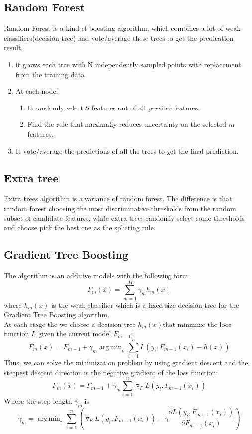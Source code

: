 \documentclass[conference]{IEEEtran}
\DeclareMathOperator*{\argmin}{arg\,min}
\begin{document}
\subsection{Random Forest}
Random Forest is a kind of boosting algorithm, which combines a lot of weak classifiers(decision tree) and vote/average these trees to get the predication result.
\begin{enumerate}
\item it grows each tree with N independently sampled points with replacement from the training data.
\item At each node:
\begin{enumerate}
\item It randomly select $S$ features out of all possible features.
\item Find the rule that maximally reduces uncertainty on the selected $m$ features.
\end{enumerate}
\item It vote/average the predictions of all the trees to get the final prediction.
\end{enumerate}

\subsection{Extra tree}
Extra trees algorithm is a variance of random forest. The difference is that random forest choosing the most discriminative thresholds from the random subset of candidate features, while extra trees randomly select some thresholds and choose pick the best one as the splitting rule.

\subsection{Gradient Tree Boosting}
The algorithm is an additive models with the following form
\begin{equation}
F_m(x)=\sum_{m=1}^{M}\gamma_m h_m(x)
\end{equation}
where $h_m(x)$ is the weak classifier which is a fixed-size decision tree for the Gradient Tree Boosting algorithm. \\
At each stage the we choose a decision tree $h_m(x)$that minimize the loos function $L$ given the current model $F_{m-1}$:  
\begin{equation}
F_m(x)=F_{m-1}+\gamma_m \argmin_h\sum_{i=1}^n L(y_i,F_{m-1}(x_i)-h(x))
\end{equation}
\indent Thus, we can solve the minimization problem by using gradient descent and the steepest descent direction is the negative gradient of the loss function:
\begin{equation}
F_m(x)=F_{m-1}+\gamma_m \sum_{i=1}^n \triangledown_F L(y_i,F_{m-1}(x_i))
\end{equation}
Where the step length $\gamma_m$ is 
\begin{equation}
\gamma_m=\argmin_{\gamma}\sum_{i=1}^n(\triangledown_F L(y_i,F_{m-1}(x_i))-\gamma\frac{\partial L(y_i,F_{m-1}(x_i))}{\partial F_{m-1}(x_i)}) 
\end{equation}
\end{document}
